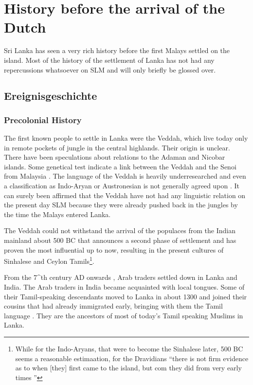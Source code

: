\section{History before the arrival of the Dutch}\label{sec:slmbg:HistorybeforethearrivaloftheDutch}
Sri Lanka has seen a very rich history before the first Malays settled on the island. Most of the history of the settlement of Lanka has not had any repercussions whatsoever on SLM and will only briefly be glossed over.
\subsection{Ereignisgeschichte}\label{sec:slmbg:preDutch:Ereignisgeschichte}
\subsubsection{Precolonial History}\label{sec:slmbg:PrecolonialHistory}
The first known people to settle in Lanka were the Veddah, which
live today only in remote pockets of jungle in the central
highlands. Their origin is unclear. There have been speculations
about relations to the Adaman and Nicobar islands.  Some genetical
test indicate a link between the Veddah and the Senoi from
Malaysia \citep[6]{Saldin2003}. The language of the Veddah is
heavily underresearched and even a classification as Indo-Aryan or
Austronesian is not generally agreed upon .
It can surely been affirmed that the Veddah have not had any
linguistic relation on the present day SLM because they were
already pushed back in the jungles by the time the Malays entered
Lanka.

 The Veddah could not withstand the arrival of the populaces from the Indian mainland about 500 BC \citep[1]{GairEtAl1997} that announces a second phase of settlement and has proven the most influential up to now, resulting in the present cultures of Sinhalese and Ceylon Tamils\footnote{While for the Indo-Aryans, that were to become the Sinhalese later, 500 BC seems a reasonable estimaation, for the Dravidians ``there is not firm evidence as to when [they] first came to the island, but com they did from very early times ''\citet[12]{Desilva1981}}.

From the 7^{th} century AD onwards \citep[51]{Codrington1926}, Arab traders settled down in Lanka and India. The Arab traders in India became acquainted with local tongues. Some of their Tamil-speaking descendants moved to Lanka in about 1300 and joined their cousins that had already immigrated early, bringing with them the Tamil language \citep[42]{Hussainmiya1990}. They are the ancestors of most of today's Tamil speaking Muslims in Lanka.

